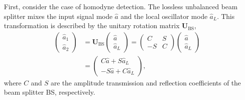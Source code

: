 \documentclass[%
final, 
superscriptaddress,
 amsmath,amssymb,amsfonts,
 aps,
 pra,
 longbibliography,
]{revtex4-2}
\newcommand{\vc}[1]{\mathbf{#1}}
\newcommand{\ind}[1]{\mathrm{#1}}
\begin{document}
First, consider the case of homodyne detection.
The lossless unbalanced beam splitter mixes the input signal mode $\hat{a}$ and the local oscillator mode $\hat{a}_L$. This transformation is described by the unitary rotation matrix $\vc{U}_{\ind{BS}}$,
\begin{align}
    \begin{pmatrix}
        \hat a_{1}\\
        \hat a_{2}
    \end{pmatrix}
    &=
    \vc{U}_{\ind{BS}}
    \begin{pmatrix}
        \hat a\\
        \hat a_{L}
    \end{pmatrix}
    =
    \begin{pmatrix}
        C & S \\
        -S & C
    \end{pmatrix}
    \begin{pmatrix}
        \hat a\\
        \hat a_{L}
    \end{pmatrix}
    \nonumber\\
    &=
    \begin{pmatrix}
        C\hat{a}+S\hat{a}_L\\
        -S\hat{a}+C\hat{a}_L
    \end{pmatrix},
\end{align}
where $C$ and $S$ are the amplitude transmission and reflection coefficients of the beam splitter BS, respectively.
\end{document}
